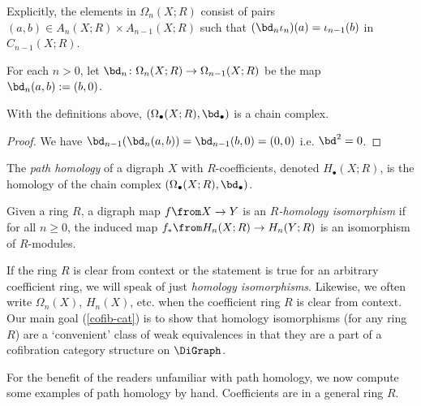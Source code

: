 Explicitly, the elements in $\Omega_n (X; R)$ consist of pairs  $(a,b) \in  A_n (X ; R) \times A_{n-1} (X ; R)$ such that $(\bd_n \iota_n)(a)=\iota_{n-1}(b)$ in $C_{n-1} (X ; R)$.

\begin{defi}
    For each $n > 0$, let $\bd_n\colon \Omega_n (X; R) \to\Omega_{n-1} (X; R)$ be the map $\bd_n(a,b) := (b,0)$.
\end{defi}

\begin{lemma}
    With the definitions above, $(\Omega_\bullet (X; R), \bd_\bullet)$ is a chain complex.
\end{lemma}
\begin{proof}
    We have $\bd_{n-1} (\bd_n (a,b)) = \bd_{n-1} (b,0) = (0,0)$ i.e. $\bd^2 = 0$.
\end{proof}

\begin{defi}
The \emph{path homology} of a digraph $X$ with $R$-coefficients, denoted $H_\bullet (X ; R)$, is the homology of the chain complex $(\Omega_\bullet (X ; R), \bd_\bullet)$.
\end{defi}


\begin{defi} \label{def:homology-iso}
    Given a ring $R$, a digraph map $f \from X \to Y$ is an \emph{$R$-homology isomorphism} if for all $n \geq 0$, the induced map $f_* \from H_n(X; R) \to H_n(Y; R)$ is an isomorphism of $R$-modules.
\end{defi}

If the ring $R$ is clear from context or the statement is true for an arbitrary coefficient ring, we will speak of just \emph{homology isomorphisms}.
Likewise, we often write $\Omega_n (X)$, $H_n (X)$, etc. when the coefficient ring $R$ is clear from context.
Our main goal (\cref{cofib-cat}) is to show that homology isomorphisms (for any ring $R$) are a `convenient' class of weak equivalences in that they are a part of a cofibration category structure on $\DiGraph$.

For the benefit of the readers unfamiliar with path homology, we now compute some examples of path homology by hand.
Coefficients are in a general ring $R$.

